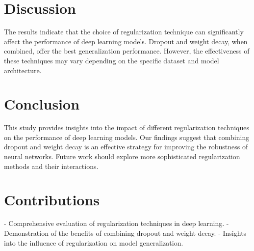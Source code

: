 \documentclass{article}
\begin{document}
\section{Discussion}
The results indicate that the choice of regularization technique can significantly affect the performance of deep learning models. Dropout and weight decay, when combined, offer the best generalization performance. However, the effectiveness of these techniques may vary depending on the specific dataset and model architecture.

\section{Conclusion}
This study provides insights into the impact of different regularization techniques on the performance of deep learning models. Our findings suggest that combining dropout and weight decay is an effective strategy for improving the robustness of neural networks. Future work should explore more sophisticated regularization methods and their interactions.

\section{Contributions}
- Comprehensive evaluation of regularization techniques in deep learning.
- Demonstration of the benefits of combining dropout and weight decay.
- Insights into the influence of regularization on model generalization.



\end{document}
